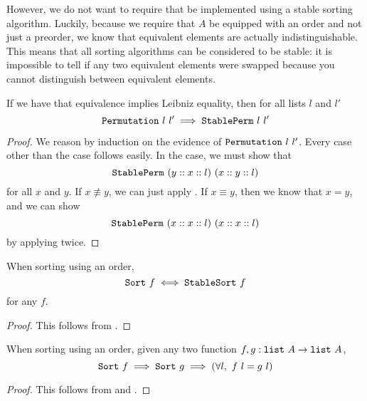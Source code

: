 \documentclass[sigplan,10pt,anonymous,review]{thesis}
\begin{document}
However, we do not want to require that  be implemented
using a stable sorting algorithm. Luckily, because we require that $A$
be equipped with an order and not just a preorder, we know that
equivalent elements are actually indistinguishable. This means that
all sorting algorithms can be considered to be stable: it is
impossible to tell if any two equivalent elements were swapped because
you cannot distinguish between equivalent elements.

\begin{theorem}
  If we have that equivalence implies Leibniz equality, then for all
  lists $l$ and $l'$
  \begin{equation*}
      \texttt{Permutation}~l~l' \implies \texttt{StablePerm}~l~l'
  \end{equation*}
\end{theorem}
\begin{proof}
  We reason by induction on the evidence of $\texttt{Permutation}~l~l'$.
  Every case other than the  case follows easily.
  In the  case, we must show that
  \begin{equation*}
    \texttt{StablePerm}~(y :: x :: l)~(x :: y :: l)
  \end{equation*}
  for all $x$ and $y$. If $x \not\equiv y$, we can just apply
  . If $x \equiv y$, then we know that $x = y$, and
  we can show
  \begin{equation*}
    \texttt{StablePerm}~(x :: x :: l)~(x :: x :: l)
  \end{equation*}
  by applying  twice.
\end{proof}

\begin{corollary}
  \label{thm:stablesort_ord}
  When sorting using an order,
  \begin{equation*}
    \texttt{Sort}~f \iff \texttt{StableSort}~f
  \end{equation*}
  for any $f$.
\end{corollary}
\begin{proof}
  This follows from .
\end{proof}

\begin{theorem}
  \label{thm:sort_ord_unique}
  When sorting using an order, given any two function $f, g:
  \texttt{list}~A \to \texttt{list}~A$,
  \begin{equation*}
    \texttt{Sort}~f \implies \texttt{Sort}~g \implies
    (\forall l,~f~l = g~l)
  \end{equation*}
\end{theorem}
\begin{proof}
  This follows from  and .
\end{proof}
\end{document}
